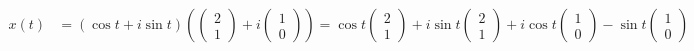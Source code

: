 \documentclass{article}
\begin{document}
\begin{align*}
    x(t) & =(\cos t + i\sin t)(\begin{pmatrix}
                                   2 \\
                                   1
                               \end{pmatrix}+i\begin{pmatrix}
                                                  1 \\
                                                  0
                                              \end{pmatrix}) = \cos t \begin{pmatrix}
                                                                          2 \\
                                                                          1
                                                                      \end{pmatrix} + i\sin t \begin{pmatrix}
                                                                                                  2 \\
                                                                                                  1
                                                                                              \end{pmatrix} + i \cos t \begin{pmatrix}
                                                                                                                           1 \\
                                                                                                                           0
                                                                                                                       \end{pmatrix} - \sin t \begin{pmatrix}
                                                                                                                                                  1 \\
                                                                                                                                                  0
                                                                                                                                              \end{pmatrix} \\

\end{align*}
\end{document}
